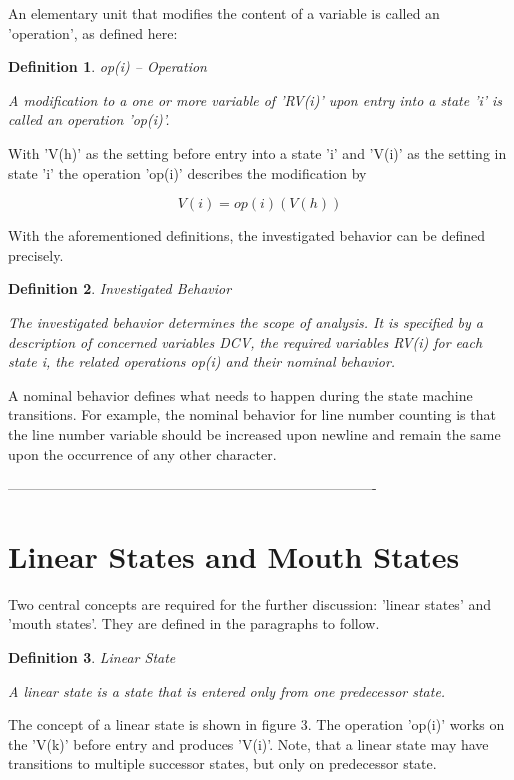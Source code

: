 \documentclass[12pt]{article}
\newtheorem{definition}{Definition}
\begin{document}
An elementary unit that modifies the content of a variable is called an
'operation', as defined here:

\begin{definition}
op(i) -- Operation 

A modification to a one or more variable of 'RV(i)' upon entry into a state
'i' is called an operation 'op(i)'. 
\end{definition}
    
With 'V(h)' as the setting before entry into a state 'i' and 'V(i)' as the
setting in state 'i' the operation 'op(i)' describes the modification by 

\[
                         V(i) = op(i)(V(h))
\]

With the aforementioned definitions, the investigated behavior can be defined
precisely.

\begin{definition}
Investigated Behavior 

The investigated behavior determines the scope of analysis. It is
specified by a description of concerned variables DCV, the required
variables RV(i) for each state i, the related operations op(i) and
their nominal behavior.
\end{definition}
    
A nominal behavior defines what needs to happen during the state machine
transitions.  For example, the nominal behavior for line number counting is
that the line number variable should be increased upon newline and remain the
same upon the occurrence of any other character. 

-------------------------------------------------------------------------------

\section{Linear States and Mouth States}

Two central concepts are required for the further discussion: 'linear states' and 'mouth
states'.  They are defined in the paragraphs to follow. 

\begin{definition}
Linear State

A linear state is a state that is entered only from one predecessor state.
\end{definition}

The concept of a linear state is shown in figure 3. The operation 'op(i)' works
on the 'V(k)' before entry and produces 'V(i)'. Note, that a linear state
may have transitions to multiple successor states, but only on predecessor state.
\end{document}
